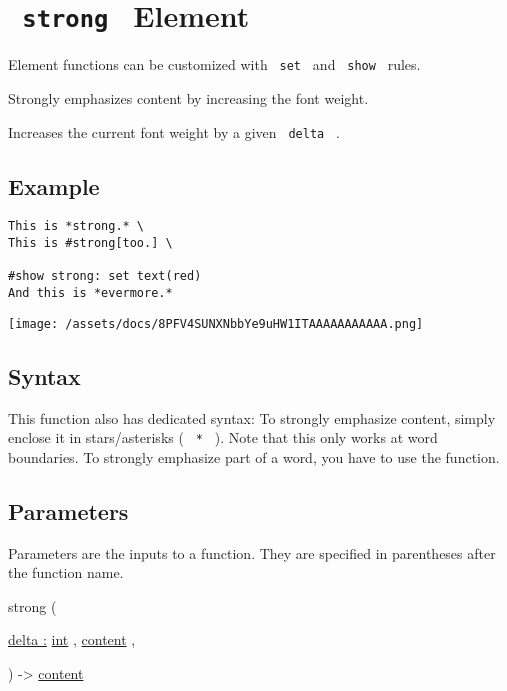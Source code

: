 \section{\texorpdfstring{\texttt{\ strong\ } {{ Element
}}}{ strong   Element }}\label{summary}

\label{element-tooltip}
Element functions can be customized with \texttt{\ set\ } and
\texttt{\ show\ } rules.

Strongly emphasizes content by increasing the font weight.

Increases the current font weight by a given \texttt{\ delta\ } .

\subsection{Example}\label{example}

\begin{verbatim}
This is *strong.* \
This is #strong[too.] \

#show strong: set text(red)
And this is *evermore.*
\end{verbatim}

\texttt{[image: /assets/docs/8PFV4SUNXNbbYe9uHW1ITAAAAAAAAAAA.png]}

\subsection{Syntax}\label{syntax}

This function also has dedicated syntax: To strongly emphasize content,
simply enclose it in stars/asterisks ( \texttt{\ *\ } ). Note that this
only works at word boundaries. To strongly emphasize part of a word, you
have to use the function.

\subsection{\texorpdfstring{{ Parameters
}}{ Parameters }}\label{parameters}

\label{parameters-tooltip}
Parameters are the inputs to a function. They are specified in
parentheses after the function name.

{ strong } (

{ \hyperref[parameters-delta]{delta :}
\href{/docs/reference/foundations/int/}{int} , } {
\href{/docs/reference/foundations/content/}{content} , }

) -\textgreater{} \href{/docs/reference/foundations/content/}{content}

